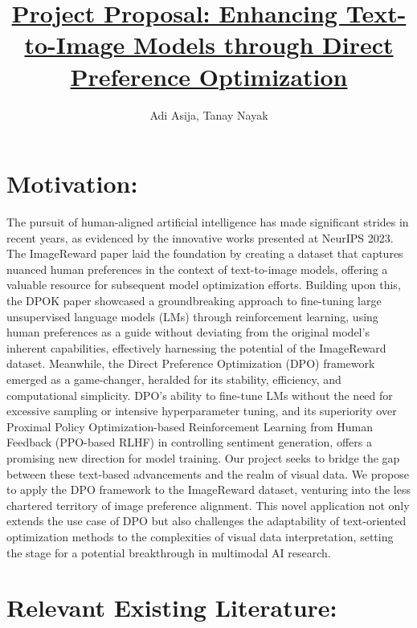 \documentclass[12pt]{article}
\title{\vspace{-1.5cm}\normalsize \bfseries \underline{Project Proposal: Enhancing Text-to-Image Models through Direct Preference Optimization}\vspace{-0.6cm}}
\author{\small Adi Asija, Tanay Nayak}
\date{}
\begin{document}
\maketitle

\thispagestyle{empty}

\setlength\parindent{0pt}
 \vspace{-2cm}
\section*{Motivation:}
The pursuit of human-aligned artificial intelligence has made significant strides in recent years, as evidenced by the innovative works presented at NeurIPS 2023. The ImageReward paper laid the foundation by creating a dataset that captures nuanced human preferences in the context of text-to-image models, offering a valuable resource for subsequent model optimization efforts. Building upon this, the DPOK paper showcased a groundbreaking approach to fine-tuning large unsupervised language models (LMs) through reinforcement learning, using human preferences as a guide without deviating from the original model's inherent capabilities, effectively harnessing the potential of the ImageReward dataset. Meanwhile, the Direct Preference Optimization (DPO) framework emerged as a game-changer, heralded for its stability, efficiency, and computational simplicity. DPO's ability to fine-tune LMs without the need for excessive sampling or intensive hyperparameter tuning, and its superiority over Proximal Policy Optimization-based Reinforcement Learning from Human Feedback (PPO-based RLHF) in controlling sentiment generation, offers a promising new direction for model training. Our project seeks to bridge the gap between these text-based advancements and the realm of visual data. We propose to apply the DPO framework to the ImageReward dataset, venturing into the less chartered territory of image preference alignment. This novel application not only extends the use case of DPO but also challenges the adaptability of text-oriented optimization methods to the complexities of visual data interpretation, setting the stage for a potential breakthrough in multimodal AI research.

\section*{Relevant Existing Literature:}
\end{document}
